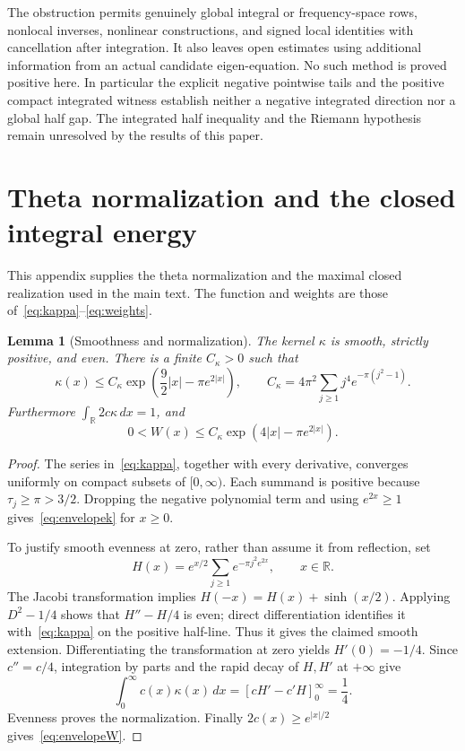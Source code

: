 \documentclass[11pt,a4paper]{article}
\numberwithin{equation}{section}
\newtheorem{lemma}[theorem]{Lemma}
\theoremstyle{definition}
\theoremstyle{remark}
\newcommand{\R}{\mathbb R}
\begin{document}
The obstruction permits genuinely global integral or frequency-space rows, nonlocal inverses, nonlinear constructions, and signed local identities with cancellation after integration. It also leaves open estimates using additional information from an actual candidate eigen-equation. No such method is proved positive here. In particular the explicit negative pointwise tails and the positive compact integrated witness establish neither a negative integrated direction nor a global half gap. The integrated half inequality and the Riemann hypothesis remain unresolved by the results of this paper.

\appendix
\section{Theta normalization and the closed integral energy}\label{app:energy}

This appendix supplies the theta normalization and the maximal closed realization used in the main text. The function and weights are those of~\eqref{eq:kappa}--\eqref{eq:weights}.

\begin{lemma}[Smoothness and normalization]\label{lem:theta}
The kernel $\kappa$ is smooth, strictly positive, and even. There is a finite $C_\kappa>0$ such that
\begin{equation}\label{eq:envelopek}
 \kappa(x)\le C_\kappa\exp\!\left(\frac92|x|-\pi e^{2|x|}\right),
 \qquad
 C_\kappa=4\pi^2\sum_{j\ge1}j^4e^{-\pi(j^2-1)}.
\end{equation}
Furthermore $\int_\R2c\kappa\,dx=1$, and
\begin{equation}\label{eq:envelopeW}
 0<W(x)\le C_\kappa\exp(4|x|-\pi e^{2|x|}).
\end{equation}
\end{lemma}
\begin{proof}
The series in~\eqref{eq:kappa}, together with every derivative, converges uniformly on compact subsets of $[0,\infty)$. Each summand is positive because $\tau_j\ge\pi>3/2$. Dropping the negative polynomial term and using $e^{2x}\ge1$ gives~\eqref{eq:envelopek} for $x\ge0$.

To justify smooth evenness at zero, rather than assume it from reflection, set
\[
 H(x)=e^{x/2}\sum_{j\ge1}e^{-\pi j^2e^{2x}},\qquad x\in\R.
\]
The Jacobi transformation \cite[Eq.~20.7.32]{DLMF} implies
$H(-x)=H(x)+\sinh(x/2)$. Applying $D^2-1/4$ shows that $H''-H/4$ is even; direct differentiation identifies it with~\eqref{eq:kappa} on the positive half-line. Thus it gives the claimed smooth extension. Differentiating the transformation at zero yields $H'(0)=-1/4$. Since $c''=c/4$, integration by parts and the rapid decay of $H,H'$ at $+\infty$ give
\[
 \int_0^\infty c(x)\kappa(x)\,dx
  =[cH'-c'H]_0^\infty=\frac14.
\]
Evenness proves the normalization. Finally $2c(x)\ge e^{|x|/2}$ gives~\eqref{eq:envelopeW}.
\end{proof}
\end{document}
